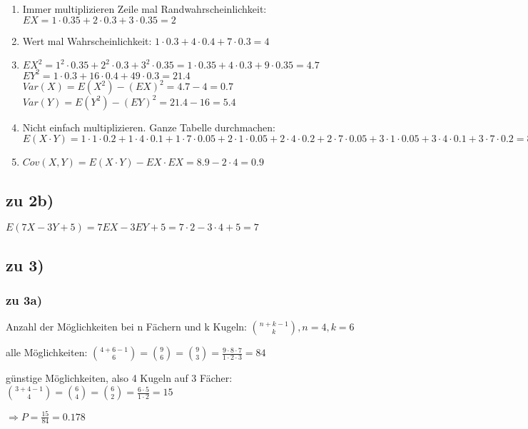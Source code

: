 \begin{enumerate}
\item Immer multiplizieren Zeile mal Randwahrscheinlichkeit: $ EX = 1\cdot 0.35 + 2\cdot 0.3 + 3\cdot 0.35 = 2$
\item Wert mal Wahrscheinlichkeit: $ 1\cdot 0.3 + 4\cdot 0.4 + 7\cdot 0.3 = 4$
\item $EX^2 = 1^2 \cdot 0.35 + 2^2\cdot 0.3 + 3^2\cdot 0.35 = 1\cdot 0.35 + 4\cdot 0.3 + 9\cdot 0.35 = 4.7$\\
$EY^2 = 1\cdot 0.3 + 16\cdot 0.4 + 49\cdot 0.3 = 21.4 $\\
$Var(X) = E(X^2) - (EX)^2 = 4.7 - 4 = 0.7$\\
$Var(Y) = E(Y^2) - (EY)^2 = 21.4 - 16 = 5.4$\\
\item Nicht einfach multiplizieren. Ganze Tabelle durchmachen: $ E(X\cdot Y) = 
1\cdot 1\cdot 0.2 + 
1\cdot 4\cdot 0.1 + 
1\cdot 7\cdot 0.05 + 
2\cdot 1\cdot 0.05 + 
2\cdot 4\cdot 0.2 + 
2\cdot 7\cdot 0.05 + 
3\cdot 1\cdot 0.05 + 
3\cdot 4\cdot 0.1 + 
3\cdot 7\cdot 0.2 = 8.9
$
\item $ Cov(X,Y) = E(X\cdot Y) - EX\cdot EX = 8.9 - 2 \cdot 4 = 0.9$
\end{enumerate}

\subsection{zu 2b)}
$ E(7X - 3Y + 5) = 7 EX - 3 EY + 5 = 7\cdot 2 - 3\cdot 4 + 5 = 7$

\subsection{zu 3)}

\subsubsection{zu 3a)}
Anzahl der Möglichkeiten bei n Fächern und k Kugeln: 
$ \binom{n+k-1}{k}, n=4, k=6 $

alle Möglichkeiten: $ \binom{4+6-1}{6} = \binom 9 6 = \binom 9 3 = \frac{9\cdot 8\cdot 7}{1\cdot 2\cdot 3} = 84$

günstige Möglichkeiten, also 4 Kugeln auf 3 Fächer: $ \binom{3+4-1}{4} = \binom 6 4 = \binom 6 2 = \frac{6\cdot 5}{1\cdot 2} = 15$

$\Rightarrow P = \frac{15}{84} = 0.178 $

